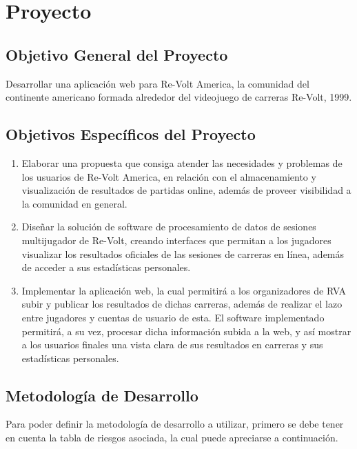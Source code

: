 \chapter{Proyecto}

\section{Objetivo General del Proyecto}
Desarrollar una aplicación web para Re-Volt America, la comunidad del continente americano formada alrededor del videojuego de carreras Re-Volt, 1999.

\section{Objetivos Específicos del Proyecto}
\begin{enumerate}
	\item Elaborar una propuesta que consiga atender las necesidades y problemas de los usuarios de Re-Volt America, en relación con el almacenamiento y visualización de resultados de partidas online, además de proveer visibilidad a la comunidad en general.
	\item Diseñar la solución de software de procesamiento de datos de sesiones multijugador de Re-Volt, creando interfaces que permitan a los jugadores visualizar los resultados oficiales de las sesiones de carreras en línea, además de acceder a sus estadísticas personales.
	\item Implementar la aplicación web, la cual permitirá a los organizadores de RVA subir y publicar los resultados de dichas carreras, además de realizar el lazo entre jugadores y cuentas de usuario de esta. El software implementado permitirá, a su vez, procesar dicha información subida a la web, y así mostrar a los usuarios finales una vista clara de sus resultados en carreras y sus estadísticas personales.
\end{enumerate}

\section{Metodología de Desarrollo}
Para poder definir la metodología de desarrollo a utilizar, primero se debe tener en cuenta la tabla de riesgos asociada, la cual puede apreciarse a continuación.

